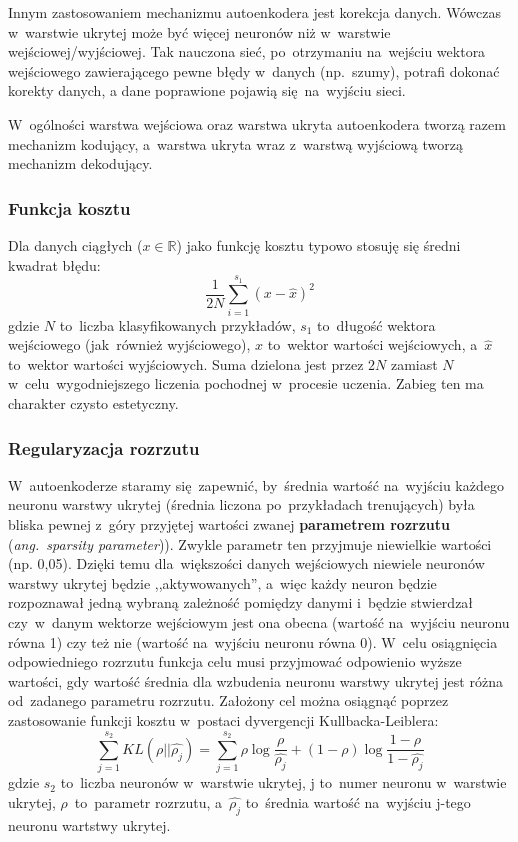 Innym zastosowaniem mechanizmu autoenkodera jest korekcja danych. Wówczas w~warstwie ukrytej
może być więcej neuronów niż w~warstwie wejściowej/wyjściowej. Tak nauczona sieć, po~otrzymaniu na~wejściu
wektora wejściowego zawierającego pewne błędy w~danych (np.~szumy), potrafi dokonać korekty danych,
a dane poprawione pojawią się~na~wyjściu sieci.

W~ogólności warstwa wejściowa oraz warstwa ukryta autoenkodera tworzą razem mechanizm kodujący, a~warstwa ukryta wraz
z~warstwą wyjściową tworzą mechanizm dekodujący.

\subsubsection{Funkcja kosztu}
Dla danych ciągłych ($x\in\mathbb{R}$) jako funkcję kosztu typowo stosuję się średni kwadrat błędu:
\begin{equation*}
\frac{1}{2N}\sum\limits_{i=1}^{s_1}(x-\hat{x})^2
\end{equation*}
gdzie $N$ to~liczba klasyfikowanych przykładów, $s_1$ to~długość wektora wejściowego (jak~również wyjściowego),
$x$ to~wektor wartości wejściowych, a~$\hat{x}$ to~wektor wartości wyjściowych. Suma dzielona jest przez $2N$ zamiast
$N$ w~celu~wygodniejszego liczenia pochodnej w~procesie uczenia. Zabieg ten ma charakter czysto estetyczny.

\subsubsection{Regularyzacja rozrzutu}
W~autoenkoderze staramy się~zapewnić, by~średnia wartość na~wyjściu każdego neuronu warstwy ukrytej
(średnia liczona po~przykładach trenujących) była bliska pewnej z~góry przyjętej wartości zwanej \textbf{parametrem
rozrzutu} (\textit{ang.~sparsity parameter})). Zwykle parametr ten przyjmuje niewielkie wartości (np. 0,05). Dzięki temu
dla~większości danych wejściowych niewiele neuronów warstwy ukrytej będzie ,,aktywowanych'', a~więc każdy neuron będzie
rozpoznawał jedną wybraną zależność pomiędzy danymi i~będzie stwierdzał czy~w~danym wektorze wejściowym jest ona obecna
(wartość na~wyjściu neuronu równa 1) czy też nie (wartość na~wyjściu neuronu równa 0). W~celu osiągnięcia odpowiedniego
rozrzutu funkcja celu musi przyjmować odpowienio wyższe wartości, gdy wartość średnia dla wzbudenia neuronu warstwy
ukrytej jest różna od~zadanego parametru rozrzutu. Założony cel można osiągnąć poprzez zastosowanie funkcji kosztu
w~postaci dyvergencji Kullbacka-Leiblera:
\begin{equation*}
\sum\limits_{j=1}^{s_2}KL(\rho||\hat{\rho_j}) = \sum\limits_{j=1}^{s_2}\rho \log\frac{\rho}{\hat{\rho_j}} +
(1-\rho)\log\frac{1-\rho}{1-\hat{\rho_j}}
\end{equation*}
gdzie $s_2$ to~liczba neuronów w~warstwie ukrytej, j to~numer neuronu w~warstwie ukrytej, $\rho$~to~parametr rozrzutu,
a~$\hat{\rho_j}$ to~średnia wartość na~wyjściu j-tego neuronu wartstwy ukrytej.

